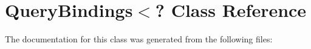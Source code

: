 \hypertarget{class_query_bindings_3_04}{}\section{Query\+Bindings$<$? Class Reference}
\label{class_query_bindings_3_04}


The documentation for this class was generated from the following files\+: